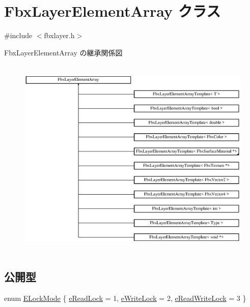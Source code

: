 \hypertarget{class_fbx_layer_element_array}{}\section{Fbx\+Layer\+Element\+Array クラス}
\label{class_fbx_layer_element_array}


{\ttfamily \#include $<$fbxlayer.\+h$>$}

Fbx\+Layer\+Element\+Array の継承関係図\begin{figure}[H]
\begin{center}
\leavevmode
\includegraphics[height=9.767442cm]{class_fbx_layer_element_array}
\end{center}
\end{figure}
\subsection*{公開型}
\begin{DoxyCompactItemize}
\item 
enum \hyperlink{class_fbx_layer_element_array_a8968b1fb337f924d0e9ca87302b54d70}{E\+Lock\+Mode} \{ \hyperlink{class_fbx_layer_element_array_a8968b1fb337f924d0e9ca87302b54d70a7b2eb94f6f2596621fb2aa043f271822}{e\+Read\+Lock} = 1, 
\hyperlink{class_fbx_layer_element_array_a8968b1fb337f924d0e9ca87302b54d70a461b83c6125c9965082658c1f67404e7}{e\+Write\+Lock} = 2, 
\hyperlink{class_fbx_layer_element_array_a8968b1fb337f924d0e9ca87302b54d70afb510a1a3f85e5a4294bd956f5f936f9}{e\+Read\+Write\+Lock} = 3
 \}
\end{DoxyCompactItemize}
